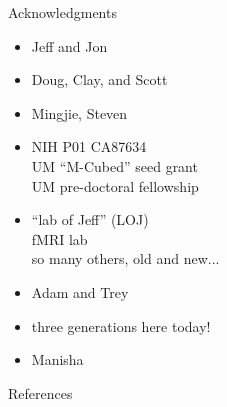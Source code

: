 \documentclass{beamer}
\begin{document}
\begin{frame}{Acknowledgments}
	\begin{itemize}[label{}]
		\item<2>{ Jeff and Jon}
		\item<3>{ Doug, Clay, and Scott}
		\item<4>{ Mingjie, Steven}
		\item<5>{%
			 NIH P01 CA87634 \\
			\makebox[3cm][l]{} UM ``M-Cubed'' seed grant \\
			\makebox[3cm][l]{} UM pre-doctoral fellowship
		}%
		\item<6>{%
			 ``lab of Jeff'' (LOJ) \\
			\makebox[3cm][l]{} fMRI lab \\
			\makebox[3cm][l]{} so many others, old and new...
		}%
		\item<7>{ Adam and Trey}
		\item<8>{ three generations here today!}
		\item<9>{ Manisha}
	\end{itemize}
\end{frame}



\begin{frame}[allowframebreaks]{References}
\end{frame}
\end{document}
